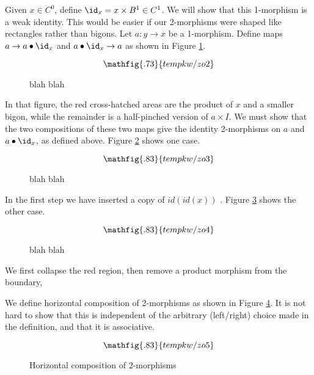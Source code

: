 Given $x\in C^0$, define $\id_x = x\times B^1 \in C^1$.
We will show that this 1-morphism is a weak identity.
This would be easier if our 2-morphisms were shaped like rectangles rather than bigons.
Let $a: y\to x$ be a 1-morphism.
Define maps $a \to a\bullet \id_x$ and $a\bullet \id_x \to a$
as shown in Figure \ref{fzo2}.
\begin{figure}[t]
\begin{equation*}
\mathfig{.73}{tempkw/zo2}
\end{equation*}
\caption{blah blah}
\label{fzo2}
\end{figure}
In that figure, the red cross-hatched areas are the product of $x$ and a smaller bigon,
while the remainder is a half-pinched version of $a\times I$.
We must show that the two compositions of these two maps give the identity 2-morphisms
on $a$ and $a\bullet \id_x$, as defined above.
Figure \ref{fzo3} shows one case.
\begin{figure}[t]
\begin{equation*}
\mathfig{.83}{tempkw/zo3}
\end{equation*}
\caption{blah blah}
\label{fzo3}
\end{figure}
In the first step we have inserted a copy of $id(id(x))$ .
Figure \ref{fzo4} shows the other case.
\begin{figure}[t]
\begin{equation*}
\mathfig{.83}{tempkw/zo4}
\end{equation*}
\caption{blah blah}
\label{fzo4}
\end{figure}
We first collapse the red region, then remove a product morphism from the boundary,

We define horizontal composition of 2-morphisms as shown in Figure \ref{fzo5}.
It is not hard to show that this is independent of the arbitrary (left/right) choice made in the definition, and that it is associative.
\begin{figure}[t]
\begin{equation*}
\mathfig{.83}{tempkw/zo5}
\end{equation*}
\caption{Horizontal composition of 2-morphisms}
\label{fzo5}
\end{figure}

